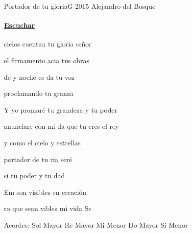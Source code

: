 \documentclass[12pt, spanish]{book}
\newcommand{\NotCCLIed}{\relax}
\begin{document}
    \begin{song}{Portador de tu gloria}{G}
    {2015} %
    {Alejandro del Bosque}
    {} %
    {} %
        \ifChordBk
            \paragraph{\mbox{}\hfill\protect\href{https://open.spotify.com/intl-es/track/62CxNSEXyhHbpXAlHigr6b}{Escuchar}\mbox{}\hfill}
        \fi


        \begin{SBOpGroup}
             cielos cuentan tu gloria señor

            el firmamento acia tus obras

            de  y noche es da tu voz

            proclamando tu granza
        \end{SBOpGroup}

        \begin{SBChorus}
            Y yo promaré tu grandeza y tu poder

            anunciare con mi da que tu eres el rey

            y como el cielo y  estrellas

            portador de tu ria seré
        \end{SBChorus}

        \begin{SBOpGroup}
             si tu poder y tu dad

            Em
            son visibles en  creación

            ro que sean vibles  mi vida Se
        \end{SBOpGroup}

        \ifChordBk
        \begin{SBOpGroup}
            Acordes:
            \upchord{\G}\qquad Sol Mayor \hfill
            \upchord{\D}\qquad Re Mayor \hfill\null\break
            \upchord{\Em}\qquad Mi Menor \hfill
            \upchord{\C}\qquad Do Mayor \hfill\null\break
            \upchord{\Bm}\qquad Si Menor \hfill\null\break
        \end{SBOpGroup}

        \fi
    \end{song}
\end{document}
